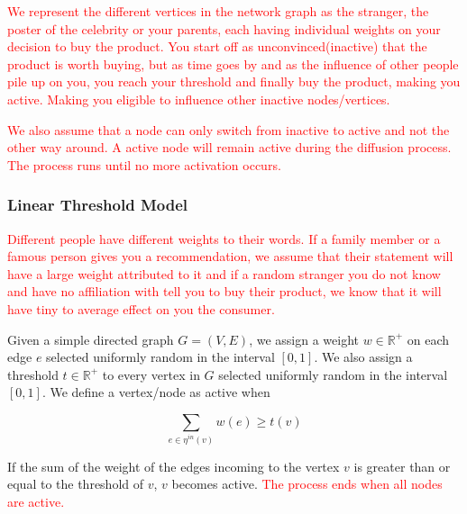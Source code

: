 \textcolor{red}{
We represent the different vertices in the network graph as the stranger, the poster of the celebrity or your parents, each having individual weights on your decision to buy the product. You start off as unconvinced(inactive) that the product is worth buying, but as time goes by and as the influence of other people pile up on you, you reach your threshold and finally buy the product, making you active. Making you eligible to influence other inactive nodes/vertices.}

\textcolor{red}{
We also assume that a node can only switch from inactive to active and not the other way around. A active node will remain active during the diffusion process. The process runs until no more activation occurs.\cite{Shakarian:2012:LSN:2456719.2457081} }
\subsubsection{Linear Threshold Model}
\textcolor{red}{Different people have different weights to their words. If a family member or a famous person gives you a recommendation, we assume that their statement will have a large weight attributed to it and if a random stranger you do not know and have no affiliation with tell you to buy their product, we know that it will have tiny to average effect on you the consumer.}

Given a simple directed graph $G=(V,E)$, we assign a weight $w\in \mathbb{R}^{+}$ on each edge $e$ selected uniformly random in the interval $[0,1]$. We also assign a threshold $t \in \mathbb{R}^{+}$ to every vertex in $G$ selected uniformly random in the interval $[0,1]$.
We define a vertex/node as active when

		$$\sum_{e \in \eta^{in}(v)} w(e)\geq t(v)$$

If the sum of the weight of the edges incoming to the vertex $v$ is greater than or equal to the threshold of $v$, $v$ becomes active. \textcolor{red}{The process ends when all nodes are active.}

